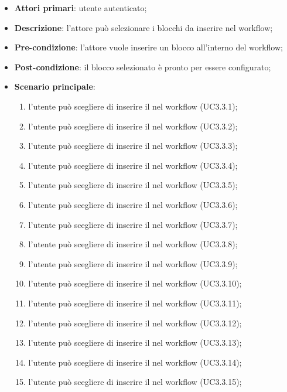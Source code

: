 \begin{itemize}
\item \textbf{Attori primari}: utente autenticato;

\item \textbf{Descrizione}: l'attore può selezionare i blocchi da inserire nel workflow;

\item \textbf{Pre-condizione}: l'attore vuole inserire un blocco all'interno del workflow;

\item \textbf{Post-condizione}: il blocco selezionato è pronto per essere configurato;

\item \textbf{Scenario principale}:
\begin{enumerate}
\item l'utente può scegliere di inserire il \BTesto{} nel workflow (UC3.3.1);
\item l'utente può scegliere di inserire il \BFiltro{} nel workflow (UC3.3.2);
\item l'utente può scegliere di inserire il \BFeedRSS{} nel workflow (UC3.3.3);
\item l'utente può scegliere di inserire il \BMeteo{} nel workflow (UC3.3.4);
\item l'utente può scegliere di inserire il \BInstagram{} nel workflow (UC3.3.5);
\item l'utente può scegliere di inserire il \BFacebook{} nel workflow (UC3.3.6);
\item l'utente può scegliere di inserire il \BMessenger{} nel workflow (UC3.3.7);
\item l'utente può scegliere di inserire il \BLinkedIn{} nel workflow (UC3.3.8);
\item l'utente può scegliere di inserire il \BSveglia{} nel workflow (UC3.3.9);
\item l'utente può scegliere di inserire il \BSlack{} nel workflow (UC3.3.10);
\item l'utente può scegliere di inserire il \BTelegram{} nel workflow (UC3.3.11);
\item l'utente può scegliere di inserire il \BMail{} nel workflow (UC3.3.12);
\item l'utente può scegliere di inserire il \BCalendario{} nel workflow (UC3.3.13);
\item l'utente può scegliere di inserire il \BYouTube{} nel workflow (UC3.3.14);
\item l'utente può scegliere di inserire il \BYouTubeMusic{} nel workflow (UC3.3.15);

\end{enumerate}
\end{itemize}
